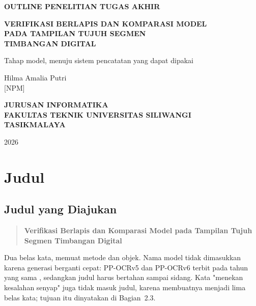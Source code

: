 \documentclass[12pt,a4paper,oneside]{report}
\newcommand{\parencite}[1]{\citep{#1}}
\begin{document}
\begin{titlepage}
  \centering
  \vspace*{0.5cm}
  {\bfseries\normalsize OUTLINE PENELITIAN TUGAS AKHIR\par}
  \vspace{1.2cm}
  {\bfseries\normalsize VERIFIKASI BERLAPIS DAN KOMPARASI MODEL\\[0.2cm]
   PADA TAMPILAN TUJUH SEGMEN\\[0.2cm] TIMBANGAN DIGITAL\par}
  \vspace{1.2cm}
  {\normalsize Tahap model, menuju sistem pencatatan yang dapat dipakai\par}
  \vspace{2cm}
  {\normalsize Hilma Amalia Putri\\[0.2cm] [NPM]\par}
  \vspace{2cm}
  {\bfseries\normalsize JURUSAN INFORMATIKA\\[0.2cm]
   FAKULTAS TEKNIK UNIVERSITAS SILIWANGI\\[0.2cm] TASIKMALAYA\par}
  \vspace{1cm}
  {\normalsize 2026\par}
\end{titlepage}

\pagestyle{isita}

\chapter{Judul}

\section{Judul yang Diajukan}

\begin{quote}
\textbf{Verifikasi Berlapis dan Komparasi Model pada Tampilan Tujuh Segmen
Timbangan Digital}
\end{quote}

Dua belas kata, memuat metode dan objek. Nama model tidak dimasukkan karena
generasi berganti cepat: PP-OCRv5 dan PP-OCRv6 terbit pada tahun yang sama
\parencite{zhang2026ppocrv5, zhang2026ppocrv6}, sedangkan judul harus bertahan
sampai sidang. Kata "menekan kesalahan senyap" juga tidak masuk judul, karena
membuatnya menjadi lima belas kata; tujuan itu dinyatakan di Bagian~2.3.
\end{document}
